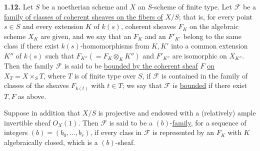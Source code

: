 \textbf{1.12.} Let \(S\) be a noetherian scheme and \(X\) an \(S\)-scheme of finite type. Let \(\mathcal F\) be a \uline{family of classes of coherent sheaves on the fibers of} \(X/S\); that is, for every point \(s\in S\) and every extension \(K\) of \(k(s)\), coherent sheaves \(F_K\) on the algebraic scheme \(X_K\) are given, and we say that an \(F_K\) and an \(F'_{K'}\) belong to the same class if there exist \(k(s)\)-homomorphisms from \(K,K'\) into a common extension \(K''\) of \(k(s)\) such that \(F_{K''}(=F_K\otimes_K K'')\) and \(F'_{K''}\) are isomorphic on \(X_{K''}\). Then the family \(\mathcal F\) is said to be \uline{bounded by the coherent sheaf} \(F\) \uline{on} \(X_T=X\times_S T\), where \(T\) is of finite type over \(S\), if \(\mathcal F\) is contained in the family of classes of the sheaves \(F_{k(t)}\) with \(t\in T\); we say that \(\mathcal F\) is \uline{bounded} if there exist \(T,F\) as above.

Suppose in addition that \(X/S\) is projective and endowed with a (relatively) ample invertible sheaf \({O}_X(1)\). Then \(\mathcal F\) is said to be a \((b)\)-\uline{family}, for a sequence of integers \((b)=(b_0,\ldots,b_r)\), if every class in \(\mathcal F\) is represented by an \(F_K\) with \(K\) algebraically closed, which is a \((b)\)-sheaf.

